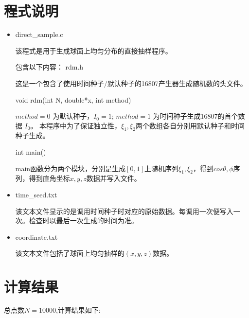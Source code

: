 \documentclass[hyperref,UTF8]{ctexart}
\begin{document}
	\section{程式说明}
	
	\begin{itemize}
		\item direct\_sample.c 
		
		该程式是用于生成球面上均匀分布的直接抽样程序。
		
		包含以下内容：
		\subitem rdm.h 
		
		这是一个包含了使用时间种子/默认种子的16807产生器生成随机数的头文件。
		
		\subitem void rdm(int N, double*x, int method)
		
		$method=0$ 为默认种子，$I_0=1$; $method=1$ 为时间种子生成16807的首个数据 $I_0$。
		本程序中为了保证独立性，$\xi_1,\xi_2$两个数组各自分别用默认种子和时间种子生成。
		
		\subitem int main()
		
		main函数分为两个模块，分别是生成$[0,1]$上随机序列$\xi_1,\xi_2$，得到$cos\theta,\phi$序列，得到直角坐标$x,y,z$数据并写入文件。	
		
		\item time\_seed.txt
		
		该文本文件显示的是调用时间种子时对应的原始数据。每调用一次便写入一次。检查时以最后一次生成的时间为准。
		
		\item coordinate.txt
		
		该文本文件包括了球面上均匀抽样的$(x,y,z)$数据。	
	\end{itemize}
	
	\section{计算结果}
	总点数$N=10000$,计算结果如下:
	
\end{document}

